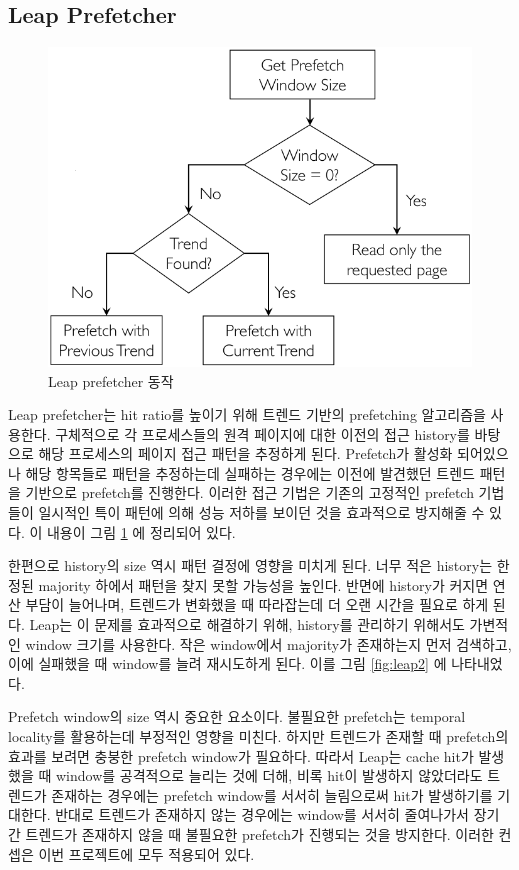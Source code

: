 \documentclass[conference,11pt]{IEEEtran}
\begin{document}
\begin{CJK}{UTF8}{}
    \subsection{Leap Prefetcher}

    \begin{figure}[t]
        \centerline{\includegraphics[width=\linewidth]{leap1.png}}
        \caption{Leap prefetcher 동작}
        \label{fig:leap1}
    \end{figure}

    Leap prefetcher는 hit ratio를 높이기 위해 트렌드 기반의 prefetching 알고리즘을 사용한다. 구체적으로 각 프로세스들의 원격 페이지에 대한 이전의 접근 history를 바탕으로 해당 프로세스의 페이지 접근 패턴을 추정하게 된다. Prefetch가 활성화 되어있으나 해당 항목들로 패턴을 추정하는데 실패하는 경우에는 이전에 발견했던 트렌드 패턴을 기반으로 prefetch를 진행한다. 이러한 접근 기법은 기존의 고정적인 prefetch 기법들이 일시적인 특이 패턴에 의해 성능 저하를 보이던 것을 효과적으로 방지해줄 수 있다. 이 내용이 그림 \ref{fig:leap1} 에 정리되어 있다.

    한편으로 history의 size 역시 패턴 결정에 영향을 미치게 된다. 너무 적은 history는 한정된 majority 하에서 패턴을 찾지 못할 가능성을 높인다. 반면에 history가 커지면 연산 부담이 늘어나며, 트렌드가 변화했을 때 따라잡는데 더 오랜 시간을 필요로 하게 된다. Leap는 이 문제를 효과적으로 해결하기 위해, history를 관리하기 위해서도 가변적인 window 크기를 사용한다. 작은 window에서 majority가 존재하는지 먼저 검색하고, 이에 실패했을 때 window를 늘려 재시도하게 된다. 이를 그림 \ref{fig:leap2} 에 나타내었다.

    Prefetch window의 size 역시 중요한 요소이다. 불필요한 prefetch는 temporal locality를 활용하는데 부정적인 영향을 미친다. 하지만 트렌드가 존재할 때 prefetch의 효과를 보려면 충붕한 prefetch window가 필요하다. 따라서 Leap는 cache hit가 발생했을 때 window를 공격적으로 늘리는 것에 더해, 비록 hit이 발생하지 않았더라도 트렌드가 존재하는 경우에는 prefetch window를 서서히 늘림으로써 hit가 발생하기를 기대한다. 반대로 트렌드가 존재하지 않는 경우에는 window를 서서히 줄여나가서 장기간 트렌드가 존재하지 않을 때 불필요한 prefetch가 진행되는 것을 방지한다. 이러한 컨셉은 이번 프로젝트에 모두 적용되어 있다.


\end{CJK}
\end{document}
